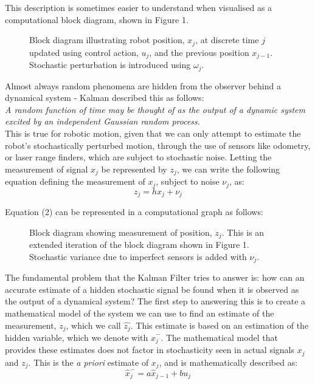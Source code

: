 \documentclass[a4paper]{article}
\begin{document}
This description is sometimes easier to understand when visualised as a computational block diagram, shown in Figure 1.
\begin{figure}[h]
\centering

\caption{Block diagram illustrating robot position, $x_j$, at discrete time $j$ updated using control action, $u_j$, and the previous position $x_{j-1}$. Stochastic perturbation is introduced using $\omega_j$.}
\end{figure}

Almost always random phenomena are hidden from the observer behind a dynamical system - Kalman described this as follows:\\

\textit{A random function of time may be thought of as the output of a dynamic system excited by an independent Gaussian random process.} \cite{Kalman:1960}\\

This is true for robotic motion, given that we can only attempt to estimate the robot's stochastically perturbed motion, through the use of sensors like odometry, or laser range finders, which are subject to stochastic noise. Letting the measurement of signal $x_j$ be represented by $z_j$, we can write the following equation defining the measurement of $x_j$, subject to noise $\nu_j$, as:
\begin{equation}
z_j = h x_j + \nu_j
\end{equation} 

Equation (2) can be represented in a computational graph as follows:
\begin{figure}[h]
\centering

\caption{Block diagram showing measurement of position, $z_j$. This is an extended iteration of the block diagram shown in Figure 1. Stochastic variance due to imperfect sensors is added with $\nu_j$.}
\end{figure}

The fundamental problem that the Kalman Filter tries to answer is: how can an accurate estimate of a hidden stochastic signal be found when it is observed as the output of a dynamical system? The first step to answering this is to create a mathematical model of the system we can use to find an estimate of the measurement, $z_j$, which we call $\hat{z_j}$. This estimate is based on an estimation of the hidden variable, which we denote with $\hat{x}^-_j$. The mathematical model that provides these estimates does not factor in stochasticity seen in actual signals $x_j$ and $z_j$. This is the \textit{a priori} estimate of $x_j$, and is mathematically described as:
\begin{equation}
\hat{x}^-_j = a \hat{x}_{j-1} + b u_j
\end{equation}
\end{document}
